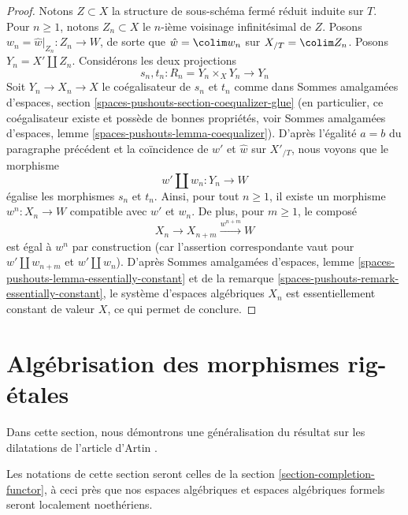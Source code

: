 \begin{proof}
\medskip\noindent
Notons $Z \subset X$ la structure de sous-schéma fermé réduit induite
sur $T$. Pour $n \geq 1$, notons $Z_n \subset X$ le $n$-ième voisinage
infinitésimal de $Z$. Posons $w_n = \hat w|_{Z_n} : Z_n \to W$,
de sorte que $\hat w = \colim w_n$ sur $X_{/T} = \colim Z_n$.
Posons $Y_n = X' \amalg Z_n$. Considérons les deux projections
$$
s_n, t_n : R_n = Y_n \times_X Y_n \longrightarrow Y_n
$$
Soit $Y_n \to X_n \to X$ le coégalisateur de $s_n$ et $t_n$ comme dans
Sommes amalgamées d'espaces, section
\ref{spaces-pushouts-section-coequalizer-glue}
(en particulier, ce coégalisateur existe et possède de bonnes propriétés,
voir Sommes amalgamées d'espaces, lemme
\ref{spaces-pushouts-lemma-coequalizer}).
D'après l'égalité $a = b$ du paragraphe précédent et la coïncidence
de $w'$ et $\hat w$ sur $X'_{/T}$, nous voyons que le morphisme
$$
w' \amalg w_n : Y_n \longrightarrow W
$$
égalise les morphismes $s_n$ et $t_n$. Ainsi, pour tout $n \geq 1$,
il existe un morphisme $w^n : X_n \to W$ compatible avec $w'$ et $w_n$.
De plus, pour $m \geq 1$, le composé
$$
X_n \to X_{n + m} \xrightarrow{w^{n + m}} W
$$
est égal à $w^n$ par construction (car l'assertion correspondante vaut
pour $w' \amalg w_{n + m}$ et $w' \amalg w_n$). D'après
Sommes amalgamées d'espaces, lemme
\ref{spaces-pushouts-lemma-essentially-constant} et de
la remarque \ref{spaces-pushouts-remark-essentially-constant},
le système d'espaces algébriques $X_n$ est essentiellement constant
de valeur $X$, ce qui permet de conclure.
\end{proof}














\section{Algébrisation des morphismes rig-étales}
\label{section-algebraization}

\noindent
Dans cette section, nous démontrons une généralisation du résultat sur les
dilatations de l'article d'Artin \cite{ArtinII}.

\medskip\noindent
Les notations de cette section seront celles de la
section \ref{section-completion-functor}, à ceci près que nos espaces
algébriques et espaces algébriques formels seront localement noethériens.

